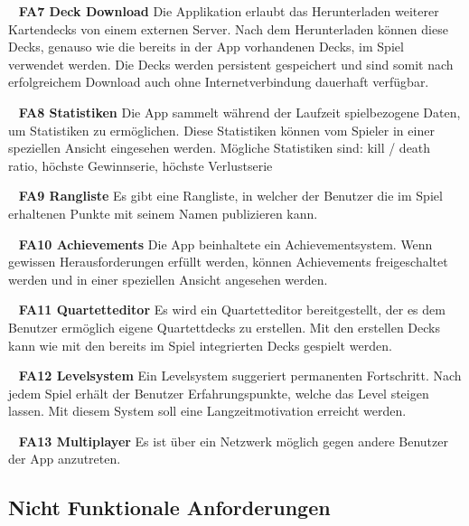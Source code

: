 \documentclass{scrartcl}
\begin{document}
\ \newline
\textbf{FA7 Deck Download} \newline
Die Applikation erlaubt das Herunterladen weiterer Kartendecks von einem
externen Server. Nach dem Herunterladen können diese Decks, genauso wie die
bereits in der App vorhandenen Decks, im Spiel verwendet werden. Die Decks werden
persistent gespeichert und sind somit nach erfolgreichem Download auch ohne
Internetverbindung dauerhaft verfügbar.

\ \newline
\textbf{FA8 Statistiken} \newline
Die App sammelt während der Laufzeit spielbezogene Daten, um Statistiken zu
ermöglichen. Diese Statistiken können vom Spieler in einer speziellen Ansicht
eingesehen werden. Mögliche Statistiken sind: kill / death ratio, höchste
Gewinnserie, höchste Verlustserie

\ \newline
\textbf{FA9 Rangliste} \newline
Es gibt eine Rangliste, in welcher der Benutzer die im Spiel erhaltenen Punkte
mit seinem Namen publizieren kann.

\ \newline
\textbf{FA10 Achievements} \newline
Die App beinhaltete ein Achievementsystem. Wenn gewissen Herausforderungen
erfüllt werden, können Achievements freigeschaltet werden und in einer
speziellen Ansicht angesehen werden.

\ \newline
\textbf{FA11 Quartetteditor} \newline
Es wird ein Quartetteditor bereitgestellt, der es dem Benutzer ermöglich
eigene Quartettdecks zu erstellen. Mit den erstellen Decks kann wie mit den
bereits im Spiel integrierten Decks gespielt werden.

\ \newline
\textbf{FA12 Levelsystem} \newline
Ein Levelsystem suggeriert permanenten Fortschritt. Nach jedem Spiel erhält der
Benutzer Erfahrungspunkte, welche das Level steigen lassen. Mit diesem System
soll eine Langzeitmotivation erreicht werden.

\ \newline
\textbf{FA13 Multiplayer} \newline
Es ist über ein Netzwerk möglich gegen andere Benutzer der App anzutreten.


\subsection{Nicht Funktionale Anforderungen}
\end{document}
